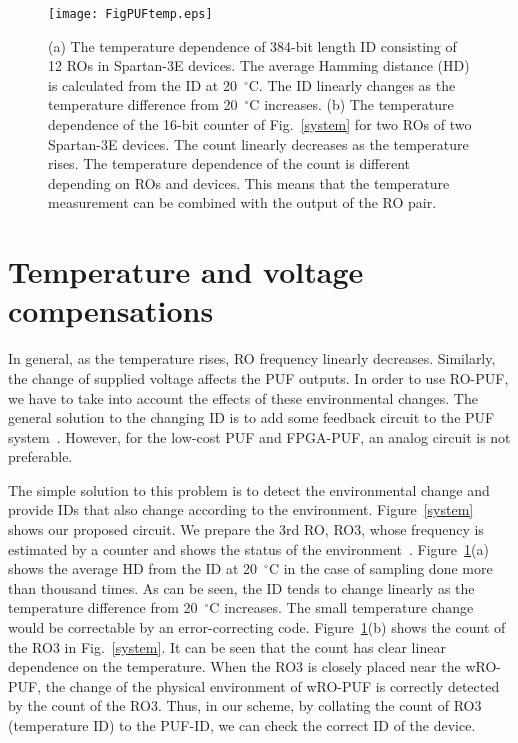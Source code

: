 ﻿\documentclass[aps,preprint,prb,superscriptaddress,amsmath,showpacs,tightenlines]{revtex4}
\begin{document}
\begin{figure}
\centering
\texttt{[image: FigPUFtemp.eps]}
\caption{
(a) The temperature dependence of 384-bit length 
ID consisting of 12 ROs in Spartan-3E devices.
The average Hamming distance (HD) is calculated 
from the ID at 20~${}^\circ$C.
The ID linearly changes as the temperature difference 
from 20~${}^\circ$C increases. 
(b)
The temperature dependence of the 16-bit counter 
of Fig.~\ref{system} for two ROs of two Spartan-3E devices.
The count linearly decreases as the temperature rises.
The temperature dependence of the count is different 
depending on ROs and devices. This means that the 
temperature measurement can be combined with the 
output of the RO pair.
} 
\label{temperature}
\end{figure}



\section{Temperature and voltage compensations}
In general, as the temperature rises, RO frequency linearly decreases.
Similarly, the change of supplied voltage affects the PUF outputs.
In order to use RO-PUF, we have to take into account 
the effects of these environmental changes. 
The general solution to the changing ID is to add some feedback 
circuit to the PUF system~\cite{Yang}. 
However, for the low-cost PUF and FPGA-PUF,
an analog circuit is not preferable. 

The simple solution to this problem is to detect the environmental change and provide 
IDs that also change according to the environment.
Figure~\ref{system} shows our proposed circuit.
We prepare the 3rd RO, RO3, whose frequency is estimated by 
a counter and shows the status of the environment~\cite{Sayed}.
Figure~\ref{temperature}(a) shows the average HD from the ID 
at 20~${}^\circ$C in the case of sampling done more than thousand times. 
As can be seen, 
the ID tends to change linearly as the temperature difference 
from 20~${}^\circ$C increases.
The small temperature change would be correctable by an error-correcting code. 
Figure~\ref{temperature}(b) shows  the count of the RO3 in Fig.~\ref{system}. 
It can be seen that the count has clear linear dependence on the temperature. 
When the RO3 is closely placed 
near the wRO-PUF, the change of the physical 
environment of wRO-PUF is correctly 
detected by the count of the RO3. Thus, in our scheme, 
by collating the count of RO3 (temperature ID) to the PUF-ID, 
we can check the correct ID of the device.
\end{document}
